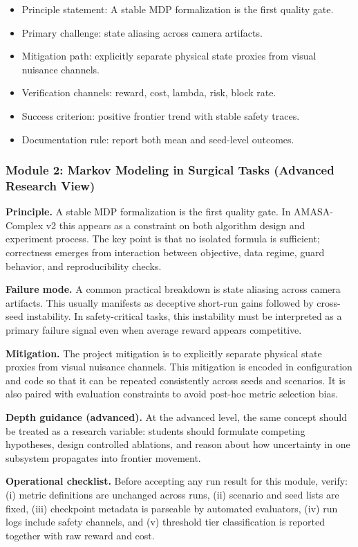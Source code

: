\documentclass[conference]{IEEEtran}
\begin{document}
\begin{itemize}[leftmargin=*]
  \item Principle statement: A stable MDP formalization is the first quality gate.
  \item Primary challenge: state aliasing across camera artifacts.
  \item Mitigation path: explicitly separate physical state proxies from visual nuisance channels.
  \item Verification channels: reward, cost, lambda, risk, block rate.
  \item Success criterion: positive frontier trend with stable safety traces.
  \item Documentation rule: report both mean and seed-level outcomes.
\end{itemize}


\subsubsection{Module 2: Markov Modeling in Surgical Tasks (Advanced Research View)}
\textbf{Principle.} A stable MDP formalization is the first quality gate. In AMASA-Complex v2 this appears as a constraint on both algorithm design and experiment process. The key point is that no isolated formula is sufficient; correctness emerges from interaction between objective, data regime, guard behavior, and reproducibility checks.

\textbf{Failure mode.} A common practical breakdown is state aliasing across camera artifacts. This usually manifests as deceptive short-run gains followed by cross-seed instability. In safety-critical tasks, this instability must be interpreted as a primary failure signal even when average reward appears competitive.

\textbf{Mitigation.} The project mitigation is to explicitly separate physical state proxies from visual nuisance channels. This mitigation is encoded in configuration and code so that it can be repeated consistently across seeds and scenarios. It is also paired with evaluation constraints to avoid post-hoc metric selection bias.

\textbf{Depth guidance (advanced).} At the advanced level, the same concept should be treated as a research variable: students should formulate competing hypotheses, design controlled ablations, and reason about how uncertainty in one subsystem propagates into frontier movement.

\textbf{Operational checklist.} Before accepting any run result for this module, verify: (i) metric definitions are unchanged across runs, (ii) scenario and seed lists are fixed, (iii) checkpoint metadata is parseable by automated evaluators, (iv) run logs include safety channels, and (v) threshold tier classification is reported together with raw reward and cost.
\end{document}
